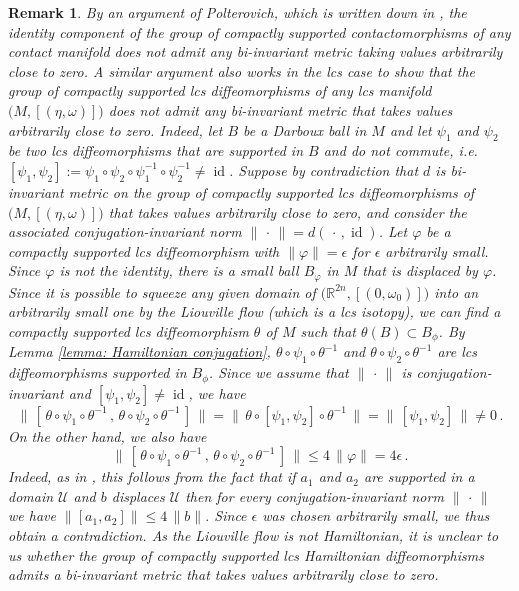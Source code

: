 \documentclass{amsart}
\DeclareMathOperator{\id}{id}
\newtheorem{remark}[thm]{Remark}
\theoremstyle{remark}
\begin{document}
\begin{remark}\label{Rmk:Finemetrics}
By an argument of Polterovich,
which is written down in \cite[Proposition 5.1]{Sandon - SP},
the identity component of the group of compactly supported contactomorphisms
of any contact manifold
does not admit any bi-invariant metric 
taking values arbitrarily close to zero.
A similar argument also works in the lcs case
to show that the group of compactly supported lcs  diffeomorphisms
of any lcs manifold $\big( M , [(\eta, \omega)] \big)$
does not admit any bi-invariant metric
that takes values arbitrarily close to zero.
Indeed,
let $B$ be a Darboux ball in $M$
and let $\psi_1$ and $\psi_2$ be two lcs  diffeomorphisms
that are supported in $B$ and do not commute,
i.e. $[\psi_1,\psi_2] := \psi_1 \circ \psi_2 \circ \psi_1^{-1} \circ \psi_2^{-1} \neq \id$. 
Suppose by contradiction that $d$
is bi-invariant metric on the group of compactly supported lcs diffeomorphisms
of $\big( M , [(\eta, \omega)] \big)$
that takes values arbitrarily close to zero,
and consider the associated conjugation-invariant norm
$\lVert \,\cdot\, \rVert = d (\,\cdot\,,\id)$.
Let $\varphi$ be a compactly supported lcs  diffeomorphism
with $\lVert \varphi \rVert = \epsilon$ for $\epsilon$ arbitrarily small.
Since $\varphi$ is not the identity,
there is a small ball $B_{\varphi}$ in $M$
that is displaced by $\varphi$.
Since it is possible to squeeze any given domain
of $\big(\mathbb{R}^{2n}, [(0, \omega_0)] \big)$
into an arbitrarily small one
by the Liouville flow
(which is a lcs isotopy),
we can find a compactly supported lcs diffeomorphism $\theta$ of $M$
such that $\theta (B) \subset B_{\phi}$.
By Lemma \ref{lemma: Hamiltonian conjugation},
$\theta \circ \psi_1 \circ \theta^{-1}$
and $\theta \circ \psi_2 \circ \theta^{-1}$
are lcs  diffeomorphisms supported in $B_{\phi}$.
Since we assume that $\lVert \, \cdot\,\rVert$ is conjugation-invariant
and $[\psi_1,\psi_2] \neq \id$,
we have
$$
\lVert \, [\, \theta \circ \psi_1 \circ \theta^{-1} \,,\,
\theta \circ \psi_2 \circ \theta^{-1} \, ] \, \rVert
= \lVert \, \theta \circ [\psi_1,\psi_2] \circ \theta^{-1} \, \rVert 
= \lVert \, [\psi_1,\psi_2] \, \rVert \neq 0 \,.
$$
On the other hand,
we also have
$$
\lVert \, [\, \theta \circ \psi_1 \circ \theta^{-1} \,,\,
\theta \circ \psi_2 \circ \theta^{-1} \,] \,\rVert
\leq 4 \, \lVert \varphi \rVert
= 4 \epsilon \,.
$$
Indeed,
as in \cite[Proposition 5.1]{Sandon - SP},
this follows from the fact that if $a_1$ and $a_2$
are supported in a domain $\mathcal{U}$
and $b$ displaces $\mathcal{U}$
then for every conjugation-invariant norm $\lVert \, \cdot\,\rVert$
we have $\lVert [a_1,a_2]\rVert \leq 4 \, \lVert b\rVert$.
Since $\epsilon$ was chosen arbitrarily small,
we thus obtain a contradiction. As the Liouville flow is not Hamiltonian, it is unclear to us whether the group of compactly supported lcs Hamiltonian diffeomorphisms admits a bi-invariant metric that takes values arbitrarily close to zero. 
\end{remark}
\end{document}
